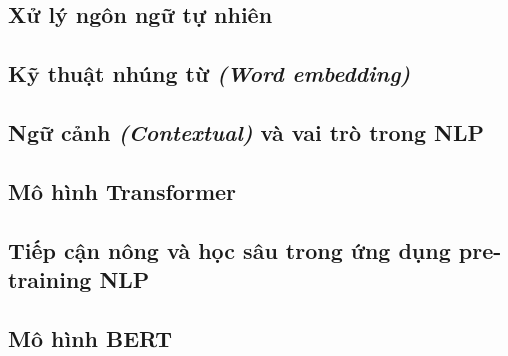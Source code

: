 \subsection{Xử lý ngôn ngữ tự nhiên}


\subsection{Kỹ thuật nhúng từ \textit{(Word embedding)}}


\subsection{Ngữ cảnh \textit{(Contextual)} và vai trò trong NLP}


\subsection{Mô hình Transformer}


\subsection{Tiếp cận nông và học sâu trong ứng dụng pre-training NLP}


\subsection{Mô hình BERT}

